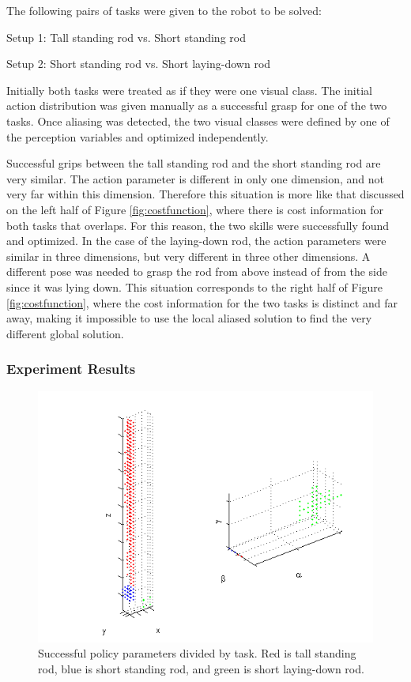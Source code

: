\documentclass[12pt]{article}
\begin{document}
	The following pairs of tasks were given to the robot to be solved:
	
Setup 1:	Tall standing rod	vs.	Short standing rod

Setup 2:	Short standing rod	vs. 	Short laying-down rod

	Initially both tasks were treated as if they were one visual class. The initial action distribution was given manually as a successful grasp for one of the two tasks. Once aliasing was detected, the two visual classes were defined by one of the perception variables and optimized independently.
	
Successful grips between the tall standing rod and the short standing rod are very similar. The action parameter is different in only one dimension, and not very far within this dimension. Therefore this situation is more like that discussed on the left half of Figure \ref{fig:costfunction}, where there is cost information for both tasks that overlaps. For this reason, the two skills were successfully found and optimized. In the case of the laying-down rod, the action parameters were similar in three dimensions, but very different in three other dimensions. A different pose was needed to grasp the rod from above instead of from the side since it was lying down. This situation corresponds to the right half of Figure \ref{fig:costfunction}, where the cost information for the two tasks is distinct and far away, making it impossible to use the local aliased solution to find the very different global solution.

\subsubsection{Experiment Results}

\begin{figure}[ht]
  \centerline{
  \includegraphics[width=0.9\columnwidth]{6d.png}}
  \caption{\label{fig_6d} Successful policy parameters divided by task. Red is tall standing rod, blue is short standing rod, and green is short laying-down rod.}
  \label{fig:6d}
\end{figure}
\end{document}
